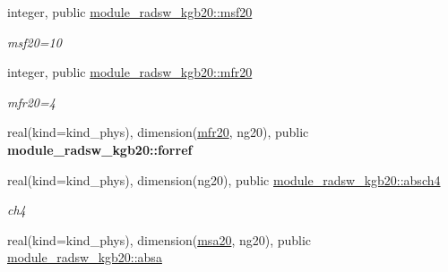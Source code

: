 \begin{DoxyCompactItemize}
\mbox{\label{group__module__radsw__kgbnn_ga925dc2da02eef4edcf000a14525a7c7e}} 
integer, public \hyperlink{group__module__radsw__kgbnn_ga925dc2da02eef4edcf000a14525a7c7e}{module\+\_\+radsw\+\_\+kgb20\+::msf20}
\begin{DoxyCompactList}\small\item\em msf20=10 \end{DoxyCompactList}\item 
\mbox{\label{group__module__radsw__kgbnn_ga9c7964eeb3acb4a11757fce977b73022}} 
integer, public \hyperlink{group__module__radsw__kgbnn_ga9c7964eeb3acb4a11757fce977b73022}{module\+\_\+radsw\+\_\+kgb20\+::mfr20}
\begin{DoxyCompactList}\small\item\em mfr20=4 \end{DoxyCompactList}\item 
\mbox{\label{group__module__radsw__kgbnn_ga3a660a7564064ca9997af9f95a5293b9}} 
real(kind=kind\+\_\+phys), dimension(\hyperlink{group__module__radsw__kgbnn_ga9c7964eeb3acb4a11757fce977b73022}{mfr20}, ng20), public {\bfseries module\+\_\+radsw\+\_\+kgb20\+::forref}
\item 
\mbox{\label{group__module__radsw__kgbnn_ga1757aee0ec8211f84e2c9334cc9b0f9d}} 
real(kind=kind\+\_\+phys), dimension(ng20), public \hyperlink{group__module__radsw__kgbnn_ga1757aee0ec8211f84e2c9334cc9b0f9d}{module\+\_\+radsw\+\_\+kgb20\+::absch4}
\begin{DoxyCompactList}\small\item\em ch4 \end{DoxyCompactList}\item 
\mbox{\label{group__module__radsw__kgbnn_ga405eabf194b1216dd083c2344e80f5b4}} 
real(kind=kind\+\_\+phys), dimension(\hyperlink{namespacemodule__radsw__kgb20_aadf199a3d453192a891b575d9adf8608}{msa20}, ng20), public \hyperlink{group__module__radsw__kgbnn_ga405eabf194b1216dd083c2344e80f5b4}{module\+\_\+radsw\+\_\+kgb20\+::absa}

\end{DoxyCompactItemize}
